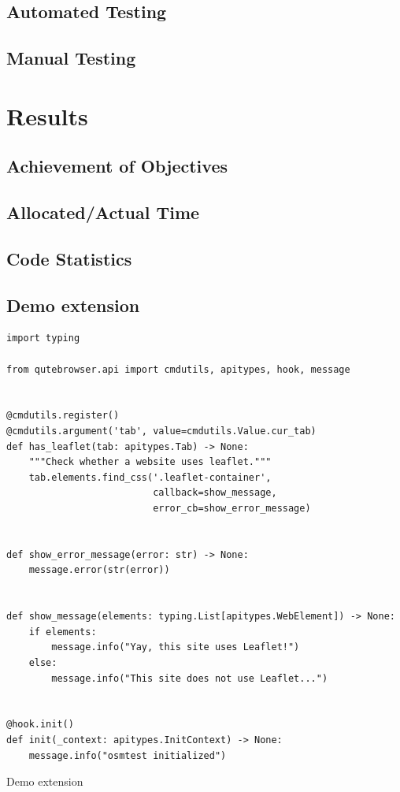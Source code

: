 \documentclass[a4paper,parskip=full]{scrreprt}
\begin{document}
\section{Automated Testing}

\section{Manual Testing}


\chapter{Results}
\label{ch:results}

\section{Achievement of Objectives}


\section{Allocated/Actual Time}
\section{Code Statistics}

\section{Demo extension}
\begin{listing}
\begin{verbatim}
import typing

from qutebrowser.api import cmdutils, apitypes, hook, message


@cmdutils.register()
@cmdutils.argument('tab', value=cmdutils.Value.cur_tab)
def has_leaflet(tab: apitypes.Tab) -> None:
    """Check whether a website uses leaflet."""
    tab.elements.find_css('.leaflet-container',
                          callback=show_message,
                          error_cb=show_error_message)


def show_error_message(error: str) -> None:
    message.error(str(error))


def show_message(elements: typing.List[apitypes.WebElement]) -> None:
    if elements:
        message.info("Yay, this site uses Leaflet!")
    else:
        message.info("This site does not use Leaflet...")


@hook.init()
def init(_context: apitypes.InitContext) -> None:
    message.info("osmtest initialized")
\end{verbatim}
\caption{Demo extension}
\end{listing}
\end{document}
